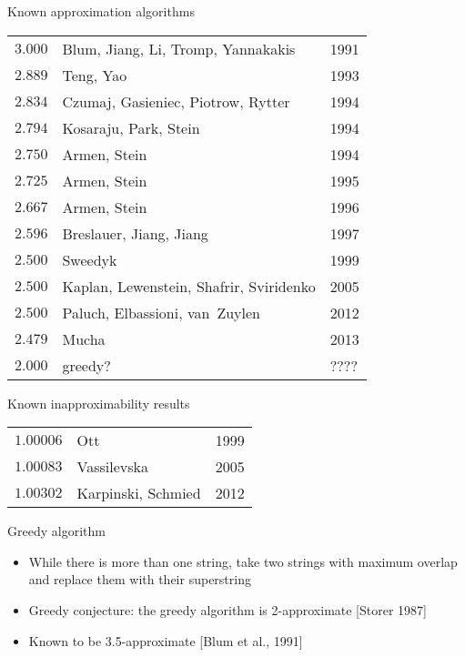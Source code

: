 \begin{frame}{Known approximation algorithms}
\small
\begin{tabular}{lll}
$3.000$ & Blum, Jiang, Li, Tromp, Yannakakis~ & 1991\\
$2.889$ & Teng, Yao & 1993\\
$2.834$ & Czumaj, Gasieniec, Piotrow, Rytter~ & 1994\\
$2.794$ & Kosaraju, Park, Stein & 1994\\
$2.750$ & Armen, Stein & 1994\\
$2.725$ & Armen, Stein & 1995\\
$2.667$ & Armen, Stein & 1996\\
$2.596$ & Breslauer, Jiang, Jiang & 1997\\
$2.500$ & Sweedyk & 1999\\
$2.500$ & Kaplan, Lewenstein, Shafrir, Sviridenko & 2005\\
$2.500$ & Paluch, Elbassioni, van~Zuylen~ & 2012\\
$2.479$ & Mucha & 2013\\
\pause
\alert{$2.000$} & \alert{greedy?} & \alert{????}
\end{tabular}
\end{frame}

\begin{frame}{Known inapproximability results}
\begin{center}
\begin{tabular}{lll}
$1.00006$ & Ott & 1999\\
$1.00083$ & Vassilevska & 2005\\
$1.00302$ & {Karpinski, Schmied} & 2012\\
\end{tabular}
\end{center}
\end{frame}

\begin{frame}{Greedy algorithm}
\begin{itemize}[<+->]
\item While there is more than one string, take two strings with maximum overlap and replace them with their superstring
\item \alert{Greedy conjecture:} the greedy algorithm is 2-approximate [Storer 1987]
\item Known to be 3.5-approximate [Blum et al., 1991]
\end{itemize}
\end{frame}

